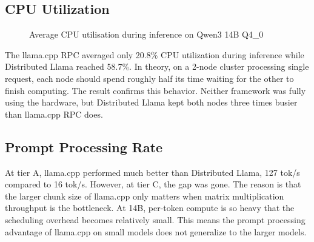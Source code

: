 \subsection{CPU Utilization}
\begin{figure}[htbp]
  \centering
  \caption{Average CPU utilisation during inference on Qwen3 14B Q4\_0}
  \label{fig:rq3-cpu}
\end{figure}
The llama.cpp RPC averaged only 20.8\% CPU utilization during inference while Distributed Llama reached 58.7\%. In theory, on a 2-node cluster processing single request, each node should spend roughly half its time waiting for the other to finish computing. The result confirms this behavior. Neither framework was fully using the hardware, but Distributed Llama kept both nodes three times busier than llama.cpp RPC does.

\subsection{Prompt Processing Rate}
At tier A, llama.cpp performed much better than Distributed Llama, 127 tok/s compared to 16 tok/s. However, at tier C, the gap was gone. The reason is that the larger chunk size of llama.cpp only matters when matrix multiplication throughput is the bottleneck. At 14B, per-token compute is so heavy that the scheduling overhead becomes relatively small. This means the prompt processing advantage of llama.cpp on small models does not generalize to the larger models. 

